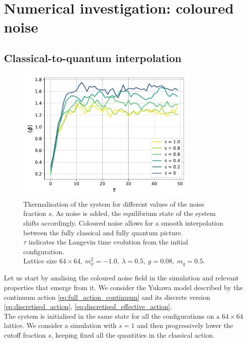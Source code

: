 \chapter{Numerical investigation: coloured noise}
\label{chapt:results_coloured}

\section{Classical-to-quantum interpolation}
\label{sec:classical_to_quantum}
\begin{figure}[h]
    \centering
    \includegraphics[width=0.8\textwidth]{figures/slide_broken/thermalisation.pdf}
    \caption[Thermalisation of the system for different values of the noise fraction $s$.]{Thermalisation of the system for different values of the noise fraction $s$. As noise is added, the equilibrium state of the system shifts accordingly. Coloured noise allows for a smooth interpolation between the fully classical and fully quantum picture.\\ $\tau$ indicates the Langevin time evolution from the initial configuration. \\ Lattice size $64 \times 64, \ m_\phi^2=-1.0, \ \lambda=0.5, \ g=0.08, \ m_q = 0.5$.}
    \label{fig:thermalisation_different_noise_fracs}
\end{figure}
Let us start by analising the coloured noise field in the simulation and relevant properties that emerge from it. We consider the Yukawa model described by the continuum action \eqref{eq:full_action_continuum} and its discrete version \eqref{eq:discretised_action}, \eqref{eq:discretised_effective_action}.\\
The system is initialised in the same state for all the configurations on a $64 \times 64$ lattice. We consider a simulation with $s=1$ and then progressively lower the cutoff fraction $s$, keeping fixed all the quantities in the classical action. \\
